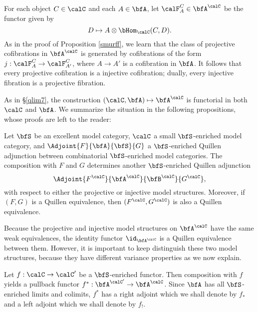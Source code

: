 
\begin{remark}\label{postsmurf}
For each object $C \in \calC$ and each $A \in \bfA$, let
$\calF^{C}_{A} \in \bfA^{\calC}$ be the functor given by
$$D \mapsto A \otimes \bHom_{\calC}(C,D).$$
As in the proof of Proposition \ref{smurff}, we learn that the
class of projective cofibrations in $\bfA^{\calC}$ is generated by
cofibrations of the form $j: \calF^{C}_{A} \rightarrow \calF^{C}_{A'}$, where
$A \rightarrow A'$ is a cofibration in $\bfA$. It follows that every projective cofibration is a injective cofibration; dually, every injective fibration is a projective fibration.
\end{remark}

As in \S \ref{qlim7}, the construction $(\calC, \bfA) \mapsto \bfA^{\calC}$ is functorial
in both $\calC$ and $\bfA$. We summarize the situation in the following
propositions, whose proofs are left to the reader:

\begin{proposition}
Let $\bfS$ be an excellent model category, $\calC$ a small $\bfS$-enriched model category, and
$\Adjoint{F}{\bfA}{\bfS}{G}$ a $\bfS$-enriched Quillen adjunction between
combinatorial $\bfS$-enriched model categories. The composition with $F$ and $G$
determines another $\bfS$-enriched Quillen adjunction
$$ \Adjoint{ F^{\calC} }{ \bfA^{\calC} }{ \bfB^{\calC} }{G^{\calC} },$$
with respect to either the projective or injective model structures.
Moreover, if $(F,G)$ is a Quillen equivalence, then $(F^{\calC}, G^{\calC})$ is also a Quillen equivalence.
\end{proposition}

Because the projective and injective model structures on
$\bfA^{\calC}$ have the same weak equivalences, the identity
functor $\id_{ \bfA^{\calC}}$ is a Quillen equivalence between them. However, it is
important to keep distinguish these two model structures, because
they have different variance properties as we now explain.

Let $f: \calC \rightarrow \calC'$ be a $\bfS$-enriched functor. Then
composition with $f$ yields a pullback functor $f^{\ast}:
\bfA^{\calC'} \rightarrow \bfA^{\calC}$. Since $\bfA$ has all
$\bfS$-enriched limits and colimits, $f^{\ast}$ has a
right adjoint which we shall denote by $f_{\ast}$ and a left
adjoint which we shall denote by $f_{!}$.


